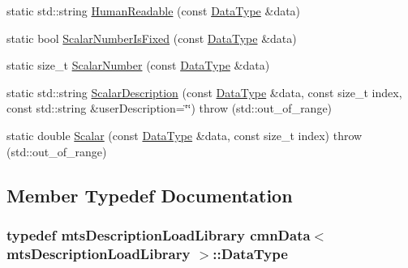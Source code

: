 \begin{DoxyCompactItemize}
\item 
static std\-::string \hyperlink{classcmn_data_3_01mts_description_load_library_01_4_a80990b8f6941211a43e77575227e6941}{Human\-Readable} (const \hyperlink{classcmn_data_3_01mts_description_load_library_01_4_a185937b284886b8335946dd8e0591d0a}{Data\-Type} \&data)
\item 
static bool \hyperlink{classcmn_data_3_01mts_description_load_library_01_4_adc6d14c1b50ef0d761e9578952c21391}{Scalar\-Number\-Is\-Fixed} (const \hyperlink{classcmn_data_3_01mts_description_load_library_01_4_a185937b284886b8335946dd8e0591d0a}{Data\-Type} \&data)
\item 
static size\-\_\-t \hyperlink{classcmn_data_3_01mts_description_load_library_01_4_a66e08a1cb5669a2c3cad6bb5af134d68}{Scalar\-Number} (const \hyperlink{classcmn_data_3_01mts_description_load_library_01_4_a185937b284886b8335946dd8e0591d0a}{Data\-Type} \&data)
\item 
static std\-::string \hyperlink{classcmn_data_3_01mts_description_load_library_01_4_a98729d32c0275fbae80c19235d22c95a}{Scalar\-Description} (const \hyperlink{classcmn_data_3_01mts_description_load_library_01_4_a185937b284886b8335946dd8e0591d0a}{Data\-Type} \&data, const size\-\_\-t index, const std\-::string \&user\-Description=\char`\"{}\char`\"{})  throw (std\-::out\-\_\-of\-\_\-range)
\item 
static double \hyperlink{classcmn_data_3_01mts_description_load_library_01_4_a87b0a9c77a386662d326d1445814431b}{Scalar} (const \hyperlink{classcmn_data_3_01mts_description_load_library_01_4_a185937b284886b8335946dd8e0591d0a}{Data\-Type} \&data, const size\-\_\-t index)  throw (std\-::out\-\_\-of\-\_\-range)
\end{DoxyCompactItemize}


\subsection{Member Typedef Documentation}
\hypertarget{classcmn_data_3_01mts_description_load_library_01_4_a185937b284886b8335946dd8e0591d0a}{
\subsubsection[{Data\-Type}]{\setlength{\rightskip}{0pt plus 5cm}typedef {\bf mts\-Description\-Load\-Library} {\bf cmn\-Data}$<$ {\bf mts\-Description\-Load\-Library} $>$\-::{\bf Data\-Type}}}\label{classcmn_data_3_01mts_description_load_library_01_4_a185937b284886b8335946dd8e0591d0a}


